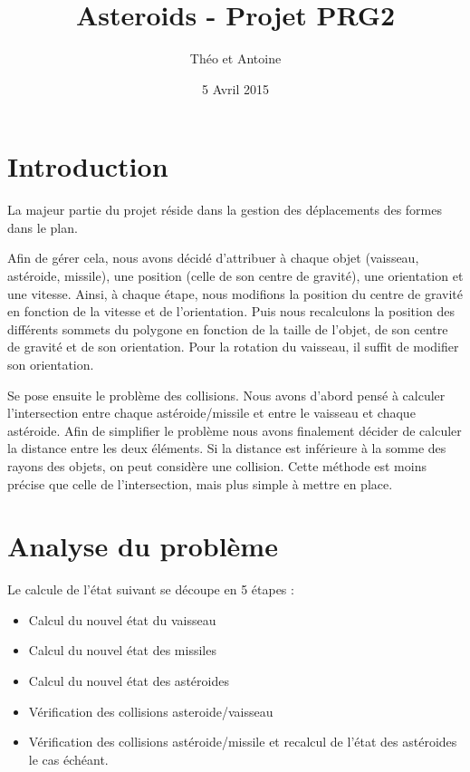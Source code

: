 \documentclass[a4paper,10pt,openany,oneside]{report}
\title{Asteroids - Projet PRG2}
\author{Théo \bsc{Nazé} et Antoine \bsc{Pinsard}}
\date{5 Avril 2015}
\begin{document}
\maketitle

\section{Introduction}

La majeur partie du projet réside dans la gestion des déplacements des formes
dans le plan.

Afin de gérer cela, nous avons décidé d'attribuer à chaque objet (vaisseau,
astéroide, missile), une position (celle de son centre de gravité), une
orientation et une vitesse. Ainsi, à chaque étape, nous modifions la position
du centre de gravité en fonction de la vitesse et de l'orientation. Puis nous
recalculons la position des différents sommets du polygone en fonction de la
taille de l'objet, de son centre de gravité et de son orientation. Pour la
rotation du vaisseau, il suffit de modifier son orientation.

Se pose ensuite le problème des collisions. Nous avons d'abord pensé à calculer
l'intersection entre chaque astéroide/missile et entre le vaisseau et chaque
astéroide. Afin de simplifier le problème nous avons finalement décider de
calculer la distance entre les deux éléments. Si la distance est inférieure à
la somme des rayons des objets, on peut considère une collision. Cette méthode
est moins précise que celle de l'intersection, mais plus simple à mettre en
place.

\section{Analyse du problème}

Le calcule de l'état suivant se découpe en 5 étapes :

\begin{itemize}
  \item Calcul du nouvel état du vaisseau
  \item Calcul du nouvel état des missiles
  \item Calcul du nouvel état des astéroides
  \item Vérification des collisions asteroide/vaisseau
  \item Vérification des collisions astéroide/missile et recalcul de l'état des
    astéroides le cas échéant.
\end{itemize}
\end{document}
